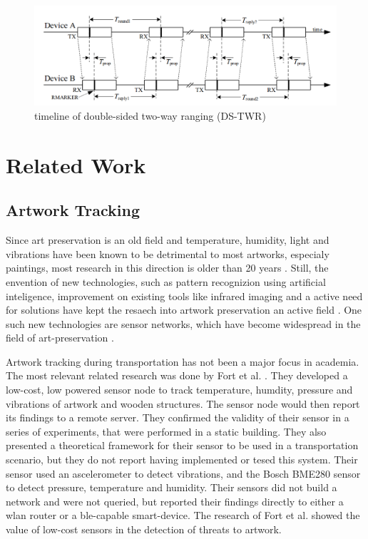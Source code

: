 \begin{figure}[ht!]
\centering
\includegraphics[width=\linewidth]{graphics/schematics/TwoSidedTwoWayRanging.PNG}
\caption{timeline of double-sided two-way ranging (DS-TWR)\cite{IEEE4z}}
\label{f:ds_twr}
\end{figure}

\section{Related Work} %


\subsection{Artwork Tracking}


Since art preservation is an old field and temperature, humidity, light and vibrations have been known to be detrimental to most artworks, especialy paintings, most research in this direction is older than 20 years \cite{mecklenburg1991mechanical, michalski1991paintings, saunders2004effect}.
Still, the envention of new technologies, such as pattern recognizion using artificial inteligence, improvement on existing tools like infrared imaging and a active need for solutions have kept the resaech into artwork preservation an active field \cite{borg2020application, schito2017integrated}.
One such new technologies are sensor networks, which have become widespread in the field of art-preservation \cite{shah2016customized}.


Artwork tracking during transportation has not been a major focus in academia.
The most relevant related research was done by Fort et al. \cite{landi2022iot}.
They developed a low-cost, low powered sensor node to track temperature, humdity, pressure and vibrations of artwork and wooden structures.
The sensor node would then report its findings to a remote server.
They confirmed the validity of their sensor in a series of experiments, that were performed in a static building.
They also presented a theoretical framework for their sensor to be used in a transportation scenario, but they do not report having implemented or tesed this system.
Their sensor used an ascelerometer to detect vibrations, and the Bosch BME280 sensor to detect pressure, temperature and humidity.
Their sensors did not build a network and were not queried, but reported their findings directly to either a wlan router or a ble-capable smart-device.
The research of Fort et al. showed the value of low-cost sensors in the detection of threats to artwork.

